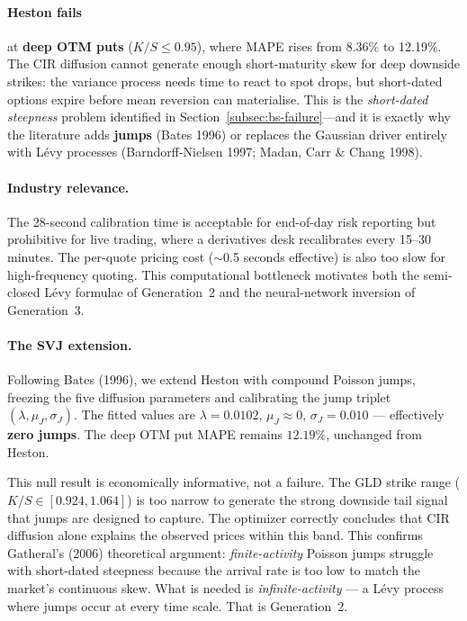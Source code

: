 \documentclass[12pt, a4paper]{article}
\begin{document}
\paragraph{Heston fails} at \textbf{deep OTM puts} ($K/S\leq 0.95$), where MAPE rises from 8.36\% to 12.19\%. The CIR diffusion cannot generate enough short-maturity skew for deep downside strikes: the variance process needs time to react to spot drops, but short-dated options expire before mean reversion can materialise. This is the \emph{short-dated steepness} problem identified in Section~\ref{subsec:bs-failure}---and it is exactly why the literature adds \textbf{jumps} (Bates 1996) or replaces the Gaussian driver entirely with L\'evy processes (Barndorff-Nielsen 1997; Madan, Carr \& Chang 1998).

\paragraph{Industry relevance.} The 28-second calibration time is acceptable for end-of-day risk reporting but prohibitive for live trading, where a derivatives desk recalibrates every 15--30 minutes. The per-quote pricing cost ($\sim$0.5 seconds effective) is also too slow for high-frequency quoting. This computational bottleneck motivates both the semi-closed L\'evy formulae of Generation~2 and the neural-network inversion of Generation~3.

\paragraph{The SVJ extension.} Following Bates (1996), we extend Heston with compound Poisson jumps, freezing the five diffusion parameters and calibrating the jump triplet $(\lambda, \mu_J, \sigma_J)$. The fitted values are $\lambda = 0.0102$, $\mu_J \approx 0$, $\sigma_J = 0.010$ --- effectively \textbf{zero jumps}. The deep OTM put MAPE remains $12.19\%$, unchanged from Heston.

This null result is economically informative, not a failure. The GLD strike range ($K/S \in [0.924, 1.064]$) is too narrow to generate the strong downside tail signal that jumps are designed to capture. The optimizer correctly concludes that CIR diffusion alone explains the observed prices within this band. This confirms Gatheral's (2006) theoretical argument: \emph{finite-activity} Poisson jumps struggle with short-dated steepness because the arrival rate is too low to match the market's continuous skew. What is needed is \emph{infinite-activity} --- a Lévy process where jumps occur at every time scale. That is Generation~2.
\end{document}
